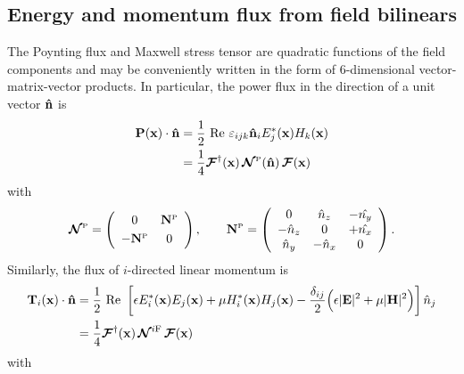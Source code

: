 \documentclass[letterpaper]{article}
\newcommand{\IF}{^{i\text{\scriptsize F}}}
\begin{document}
\subsection*{Energy and momentum flux from field bilinears}

The Poynting flux and Maxwell stress tensor are quadratic functions
of the field components and may be conveniently written in the form
of 6-dimensional vector-matrix-vector products. 
In particular, the power flux in the direction of a unit vector 
$\mathbf{\hat n}$ is
\begin{align}
 \mathbf{P}(\mathbf{x}) \cdot \mathbf{\hat n}
   &=\frac{1}{2}\text{ Re }\varepsilon_{ijk}\mathbf{\hat n}_i E^*_j(\mathbf{x}) H_k(\mathbf{x})
\nonumber \\
   &=\frac{1}{4}\boldsymbol{\mathcal{F}}^\dagger(\mathbf{x}) \, \boldsymbol{\mathcal{N}}^{\hbox{\tiny{P}}}(\mathbf{\hat n}) \, \boldsymbol{\mathcal{F}}(\mathbf{x})
\label{PVMVP}
\end{align}
with
$$
   \boldsymbol{\mathcal{N}}^{\hbox{\tiny{P}}}=
   \left(\begin{array}{cc}
   0       & \mathbf{N}^{\hbox{\tiny{P}}}   \\ [3pt]
  -\mathbf{N}^{\hbox{\tiny{P}}} & 0
   \end{array}\right), 
\qquad 
   \mathbf{N}^{\hbox{\tiny{P}}}
   =
   \left(\begin{array}{ccc}
   0          &  \hat{n}_z & -\hat{n_y} \\
  -\hat{n}_z  &  0         & +\hat{n_x} \\
   \hat{n}_y  & -\hat{n}_x & 0
   \end{array}\right).
$$
Similarly, the flux of $i$-directed linear momentum is
\begin{align}
 \vb T_{i}(\vb x) \cdot \vbhat{n} 
&=\frac{1}{2}\text{ Re }
  \left[ \epsilon E^*_i(\vb x) E_j(\vb x) 
             +\mu H^*_i(\vb x) H_j(\vb x) 
       -\frac{\delta_{ij}}{2}
         \Big( \epsilon |\vb E|^2
              +\mu      |\vb H|^2
         \Big)
 \right] \hat {n}_j
\nn
&= \frac{1}{4}\bmc{F}^\dagger(\vb x) 
   \, \bmc{N}\IF \, \bmc{F}(\vb x)
\label{IFVMVP}
\end{align}
with
\end{document}
